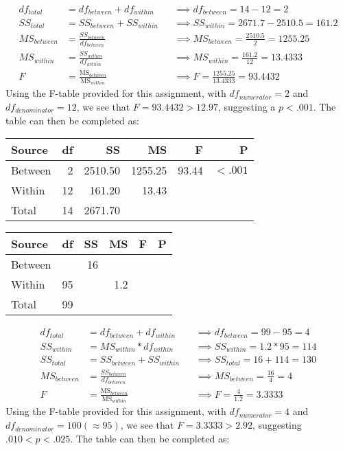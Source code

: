 \documentclass[onecolumn,10pt]{jhwhw}
\begin{document}
\begin{align*}
df_{total} &= df_{between} + df_{within} && \implies df_{between} = 14-12 = 2\\
SS_{total} &= SS_{between} + SS_{within} && \implies SS_{within} = 2671.7-2510.5=161.2\\
MS_{between} &= \frac{SS_{between}}{df_{between}} && \implies MS_{between} = \frac{2510.5}{2} = 1255.25 \\
MS_{within}  &= \frac{SS_{within}}{df_{within}}   && \implies MS_{within}  = \frac{161.2}{12} = 13.4333 \\
F &= \frac{\mbox{MS}_{between}}{\mbox{MS}_{within}} && \implies F = \frac{1255.25}{13.4333} = 93.4432
\end{align*}
Using the F-table provided for this assignment, with $df_{numerator} = 2$ and $df_{denominator} = 12$, we see that $F = 93.4432 > 12.97$, suggesting a $p < .001$. The table can then be completed as:

\begin{center}
\begin{tabular}{l r r r r r}
\toprule
Source & df & SS & MS & F & P \\
\midrule
Between &  2 & 2510.50 & 1255.25 & 93.44 & $<.001$ \\
Within  & 12 &  161.20 & 13.43 & & \\
Total   & 14 & 2671.70 & & & \\
\bottomrule
\end{tabular}
\end{center}

\problem{}
\begin{center}
\begin{tabular}{l r r r r r}
\toprule
Source & df & SS & MS & F & P \\
\midrule
Between &    & 16 &     & & \\
Within  & 95 &    & 1.2 & & \\
Total   & 99 &    &     & & \\
\bottomrule
\end{tabular}
\end{center}

\begin{align*}
df_{total} &= df_{between} + df_{within} && \implies df_{between} = 99-95 = 4\\
SS_{within} &= MS_{within} * df_{within} && \implies SS_{within} = 1.2 * 95 = 114\\
SS_{total} &= SS_{between} + SS_{within} && \implies SS_{total} = 16 + 114 = 130\\
MS_{between} &= \frac{SS_{between}}{df_{between}} && \implies MS_{between} = \frac{16}{4} = 4 \\
F &= \frac{\mbox{MS}_{between}}{\mbox{MS}_{within}} && \implies F = \frac{4}{1.2} = 3.3333
\end{align*}
Using the F-table provided for this assignment, with $df_{numerator} = 4$ and $df_{denominator} = 100 (\approx 95)$, we see that $F = 3.3333 > 2.92$, suggesting $.010 < p < .025$. The table can then be completed as:
\end{document}
